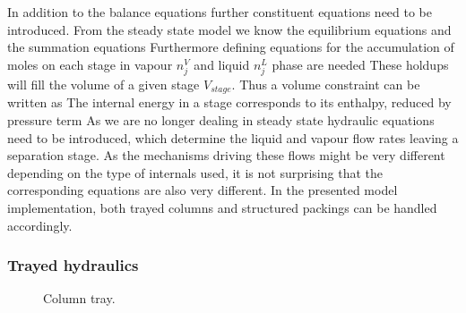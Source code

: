     In addition to the balance equations further constituent equations need to be introduced. From the
    steady state model we know the equilibrium equations
    and the summation equations
    Furthermore defining equations for the accumulation of moles on each stage in vapour $n_j^V$ and
    liquid $n_j^L$ phase are needed
    These holdups will fill the volume of a given stage $V_{stage}$. Thus a volume constraint
    can be written as
    The internal energy in a stage corresponds to its enthalpy, reduced by pressure term
    As we are no longer dealing in steady state hydraulic equations need to be introduced,
    which determine the liquid and vapour flow rates leaving a separation stage. As the
    mechanisms driving these flows might be very different depending on the type of internals
    used, it is not surprising that the corresponding equations are also very different. In the
    presented model implementation, both trayed columns and structured packings can be handled accordingly.

    \subsubsection{Trayed hydraulics}
    \label{sec:mathpro:dynamic:trayhyd}
        \begin{figure}
            \center
                \center
                
                \caption{Column tray.}
                \label{fig:col_tray}
%                
        \end{figure}

